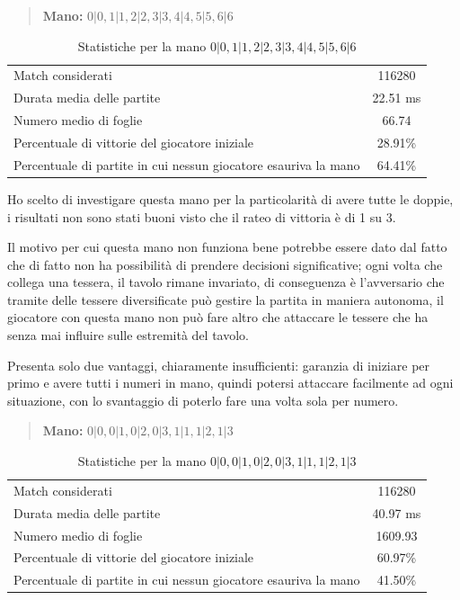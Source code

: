 \documentclass[a4paper,12pt]{report}
\begin{document}
\begin{quote}
    \textbf{Mano:} \(0|0, 1|1, 2|2, 3|3, 4|4, 5|5, 6|6\)
\end{quote}

\begin{table}[h!]
    \centering
    \begin{tabular}{|l|c|}
        \hline
        Match considerati & 116280 \\
        Durata media delle partite & 22.51 ms \\
        Numero medio di foglie & 66.74 \\
        Percentuale di vittorie del giocatore iniziale & 28.91\% \\
        Percentuale di partite in cui nessun giocatore esauriva la mano & 64.41\% \\
        \hline
    \end{tabular}
    \caption{Statistiche per la mano \(0|0, 1|1, 2|2, 3|3, 4|4, 5|5, 6|6\)}
    \label{tab:stats_1}
\end{table}

Ho scelto di investigare questa mano per la particolarità di avere tutte le doppie, i risultati non sono stati buoni visto che il rateo di vittoria è di 1 su 3.

Il motivo per cui questa mano non funziona bene potrebbe essere dato dal fatto che di fatto non ha possibilità di prendere decisioni significative; ogni volta che collega una tessera, il tavolo rimane invariato, di conseguenza è l'avversario che tramite delle tessere diversificate può gestire la partita in maniera autonoma, il giocatore con questa mano non può fare altro che attaccare le tessere che ha senza mai influire sulle estremità del tavolo.

Presenta solo due vantaggi, chiaramente insufficienti: garanzia di iniziare per primo e avere tutti i numeri in mano, quindi potersi attaccare facilmente ad ogni situazione, con lo svantaggio di poterlo fare una volta sola per numero.

\begin{quote}
    \textbf{Mano:} \(0|0, 0|1, 0|2, 0|3, 1|1, 1|2, 1|3\)
\end{quote}

\begin{table}[h!]
    \centering
    \begin{tabular}{|l|c|}
        \hline
        Match considerati & 116280 \\
        Durata media delle partite & 40.97 ms \\
        Numero medio di foglie & 1609.93 \\
        Percentuale di vittorie del giocatore iniziale & 60.97\% \\
        Percentuale di partite in cui nessun giocatore esauriva la mano & 41.50\% \\
        \hline
    \end{tabular}
    \caption{Statistiche per la mano \(0|0, 0|1, 0|2, 0|3, 1|1, 1|2, 1|3\)}
    \label{tab:stats_2}
\end{table}
\end{document}
